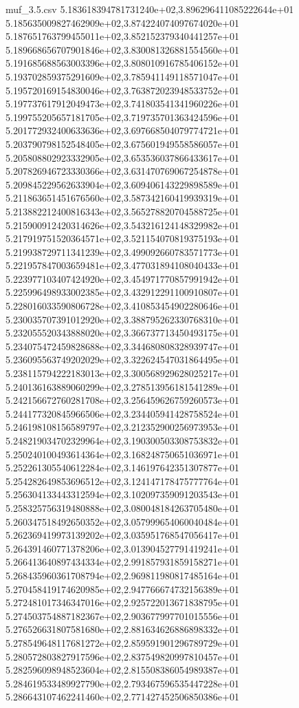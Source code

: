 \begin{filecontents*}{muf_3.5.csv}
5.183618394781731240e+02,3.896296411085222644e+01
5.185635009827462909e+02,3.874224074097674020e+01
5.187651763799455011e+02,3.852152379340441257e+01
5.189668656707901846e+02,3.830081326881554560e+01
5.191685688563003396e+02,3.808010916785406152e+01
5.193702859375291609e+02,3.785941149118571047e+01
5.195720169154830046e+02,3.763872023948533752e+01
5.197737617912049473e+02,3.741803541341960226e+01
5.199755205657181705e+02,3.719735701363424596e+01
5.201772932400633636e+02,3.697668504079774721e+01
5.203790798152548405e+02,3.675601949558586057e+01
5.205808802923332905e+02,3.653536037866433617e+01
5.207826946723330366e+02,3.631470769067254878e+01
5.209845229562633904e+02,3.609406143229898589e+01
5.211863651451676560e+02,3.587342160419939319e+01
5.213882212400816343e+02,3.565278820704588725e+01
5.215900912420314626e+02,3.543216124148329982e+01
5.217919751520364571e+02,3.521154070819375193e+01
5.219938729711341239e+02,3.499092660783571773e+01
5.221957847003659481e+02,3.477031894108040433e+01
5.223977103407424920e+02,3.454971770857991942e+01
5.225996498933002385e+02,3.432912291100910807e+01
5.228016033590806728e+02,3.410853454902280646e+01
5.230035707391012920e+02,3.388795262330768310e+01
5.232055520343888020e+02,3.366737713450493175e+01
5.234075472459828688e+02,3.344680808328939747e+01
5.236095563749202029e+02,3.322624547031864495e+01
5.238115794222183013e+02,3.300568929628025217e+01
5.240136163889060299e+02,3.278513956181541289e+01
5.242156672760281708e+02,3.256459626759260573e+01
5.244177320845966506e+02,3.234405941428758524e+01
5.246198108156589797e+02,3.212352900256973953e+01
5.248219034702329964e+02,3.190300503308753832e+01
5.250240100493614364e+02,3.168248750651036971e+01
5.252261305540612284e+02,3.146197642351307877e+01
5.254282649853696512e+02,3.124147178475777764e+01
5.256304133443312594e+02,3.102097359091203543e+01
5.258325756319480888e+02,3.080048184263705480e+01
5.260347518492650352e+02,3.057999654060040484e+01
5.262369419973139202e+02,3.035951768547056417e+01
5.264391460771378206e+02,3.013904527791419241e+01
5.266413640897434334e+02,2.991857931859158271e+01
5.268435960361708794e+02,2.969811980817485164e+01
5.270458419174620985e+02,2.947766674732156389e+01
5.272481017346347016e+02,2.925722013671838795e+01
5.274503754887182367e+02,2.903677997701015556e+01
5.276526631807581680e+02,2.881634626886898332e+01
5.278549648117681272e+02,2.859591901296789729e+01
5.280572803827917596e+02,2.837549820997810457e+01
5.282596098948523604e+02,2.815508386054989387e+01
5.284619533489927790e+02,2.793467596535447228e+01
5.286643107462241460e+02,2.771427452506850386e+01

\end{filecontents*}
